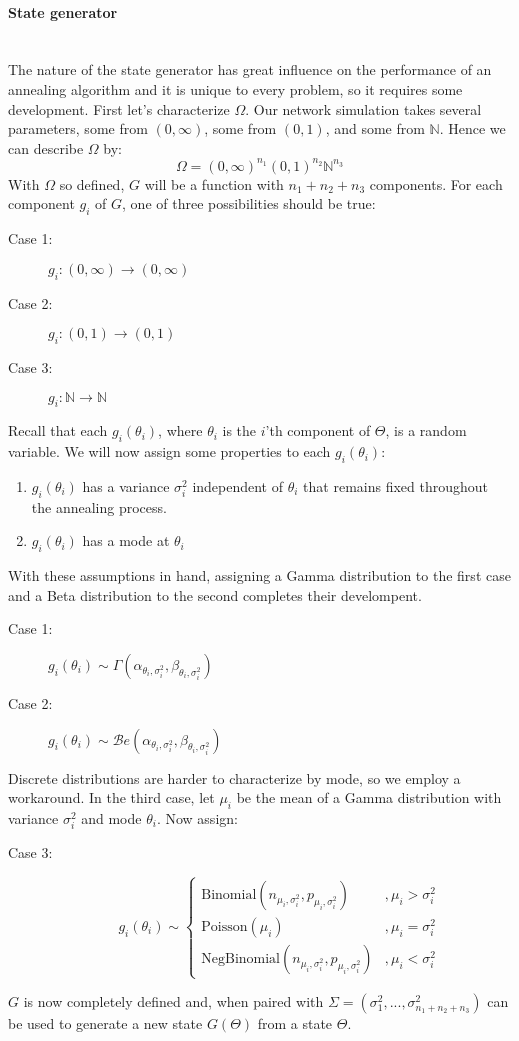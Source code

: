 \documentclass[12pt]{scrartcl}
\newcommand{\N}{\mathbb{N}}
\begin{document}
\paragraph{State generator}\mbox{}\\
The nature of the state generator has great influence on the performance of an annealing algorithm and it is unique to every problem, so it requires some development. First let's characterize $\Omega$. Our network simulation takes several parameters, some from $(0,\infty)$, some from $(0,1)$, and some from $\N$. Hence we can describe $\Omega$ by:
\[\Omega = (0,\infty)^{n_1}(0,1)^{n_2}\N^{n_3}\]
With $\Omega$ so defined, $G$ will be a function with $n_1+n_2+n_3$  components. For each component $g_i$ of $G$, one of three possibilities should be true:
\begin{description}
\item[Case 1:]$g_i:(0,\infty) \rightarrow (0,\infty)$
\item[Case 2:]$g_i:(0,1)        \rightarrow (0,1)$
\item[Case 3:]$g_i:\N          \rightarrow \N$
\end{description}
Recall that each $g_i(\theta_i)$, where $\theta_i$ is the $i$'th component of $\Theta$, is a random variable. We will now assign some properties to each $g_i(\theta_i)$:
\begin{enumerate}
\item $g_i(\theta_i)$ has a variance $\sigma_i^2$ independent of $\theta_i$ that remains fixed throughout the annealing process.
\item $g_i(\theta_i)$ has a mode at $\theta_i$
\end{enumerate}
With these assumptions in hand, assigning a Gamma distribution to the first case and a Beta distribution to the second completes their develompent.
\begin{description}
\item[Case 1:]$g_i(\theta_i) \sim \Gamma(\alpha_{\theta_i,\sigma^2_i},\beta_{\theta_i,\sigma^2_i})$
\item[Case 2:]$g_i(\theta_i) \sim \mathcal{B}e(\alpha_{\theta_i,\sigma^2_i},\beta_{\theta_i,\sigma^2_i})$
\end{description}
Discrete distributions are harder to characterize by mode, so we employ a workaround. In the third case, let $\mu_i$ be the mean of a Gamma distribution with variance $\sigma^2_i$ and mode $\theta_i$. Now assign:
\begin{description}
\item[Case 3:]\[g_i(\theta_i) \sim \left\{\begin{array}{cc}
\text{Binomial}(n_{\mu_i,\sigma^2_i},p_{\mu_i,\sigma^2_i}) & ,\mu_i > \sigma^2_i \\
\text{Poisson}(\mu_i) & ,\mu_i = \sigma^2_i \\
\text{NegBinomial}(n_{\mu_i,\sigma^2_i},p_{\mu_i,\sigma^2_i}) & ,\mu_i < \sigma^2_i 
\end{array}\right.\]
\end{description}
$G$ is now completely defined and, when paired with $\Sigma=(\sigma^2_1,...,\sigma^2_{n_1+n_2+n_3})$ can be used to generate a new state $G(\Theta)$ from a state $\Theta$.
\end{document}
